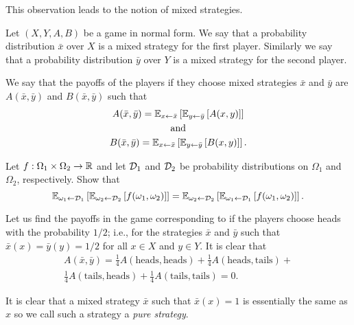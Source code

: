 This observation leads to the notion of mixed strategies.
\begin{definition}
  Let $(X, Y, A, B)$ be a game in normal form. We say that a probability
  distribution $\bar{x}$ over $X$ is a mixed strategy for the first player.
  Similarly we say that a probability distribution $\bar{y}$ over $Y$ is a mixed
  strategy for the second player.


  We say that the payoffs of the players if they choose mixed strategies
  $\bar{x}$ and $\bar{y}$ are $A(\bar{x}, \bar{y})$ and $B(\bar{x}, \bar{y})$ 
  such that
  \begin{gather*}
    A(\bar{x}, \bar{y}) = 
      \expectation[x \gets \bar{x}]{\expectation[y \gets \bar{y}]{A(x, y)}} \\ 
    \text{and} \\
    B(\bar{x}, \bar{y}) = 
      \expectation[x \gets \bar{x}]{\expectation[y \gets \bar{y}]{B(x, y)}}.
  \end{gather*}
\end{definition}

\begin{exercise}
  Let $f : \Omega_1 \times \Omega_2 \to \R$ and let $\Distribution{D}_1$ and
  $\Distribution{D}_2$ be probability distributions on $\Omega_1$ and
  $\Omega_2$, respectively. Show that 
  \[
  \expectation[\omega_1 \gets \Distribution{D}_1]{
    \expectation[\omega_2 \gets \Distribution{D}_2]{f(\omega_1, \omega_2)}
  } = 
  \expectation[\omega_2 \gets \Distribution{D}_2]{
    \expectation[\omega_1 \gets \Distribution{D}_1]{f(\omega_1, \omega_2)}}.
  \]
\end{exercise}

Let us find the payoffs in the game corresponding  to
 if the players choose heads with the
probability $1 / 2$; i.e., for the strategies $\bar{x}$ and $\bar{y}$ such that
$\bar{x}(x) = \bar{y}(y) = 1 / 2$ for all $x \in X$ and $y \in Y$. It is clear
that 
\begin{multline*}
  A(\bar{x}, \bar{y}) = 
  \frac{1}{4} A(\text{heads}, \text{heads}) + 
  \frac{1}{4} A(\text{heads}, \text{tails}) + \\
  \frac{1}{4} A(\text{tails}, \text{heads}) +
  \frac{1}{4} A(\text{tails}, \text{tails}) = 0.
\end{multline*}

It is clear that a mixed strategy $\bar{x}$ such that $\bar{x}(x) = 1$ is
essentially the same as $x$ so we call such a strategy a \emph{pure strategy}.

